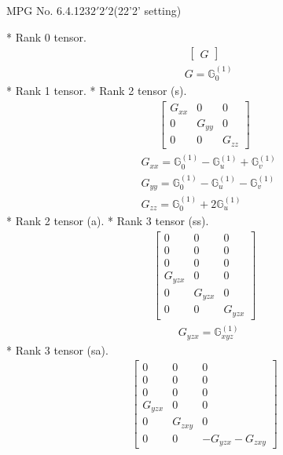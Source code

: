 \documentclass[fleqn,8pt,landscape]{jsarticle}
\begin{document}
\setcounter{MaxMatrixCols}{32}

\renewcommand{\tablename}{Table~}
\renewcommand{\figurename}{Figure~}
\begin{center}
\LARGE
MPG No. 6.4.123\quad$2'2'2$\quad(22'2' setting)
\end{center}
* Rank 0 tensor.
\begin{align*}
\begin{bmatrix} G \end{bmatrix}
\end{align*}
\begin{align*}
& G = \mathbb{G}_{0}^{(1)}
\end{align*}
* Rank 1 tensor.
* Rank 2 tensor (s).
\begin{align*}
\begin{bmatrix} G_{xx} & 0 & 0 \\ 0 & G_{yy} & 0 \\ 0 & 0 & G_{zz} \end{bmatrix}
\end{align*}
\begin{align*}
& G_{xx} = \mathbb{G}_{0}^{(1)} - \mathbb{G}_{u}^{(1)} + \mathbb{G}_{v}^{(1)} \\
& G_{yy} = \mathbb{G}_{0}^{(1)} - \mathbb{G}_{u}^{(1)} - \mathbb{G}_{v}^{(1)} \\
& G_{zz} = \mathbb{G}_{0}^{(1)} + 2 \mathbb{G}_{u}^{(1)}
\end{align*}
* Rank 2 tensor (a).
* Rank 3 tensor (ss).
\begin{align*}
\begin{bmatrix} 0 & 0 & 0 \\ 0 & 0 & 0 \\ 0 & 0 & 0 \\ G_{yzx} & 0 & 0 \\ 0 & G_{yzx} & 0 \\ 0 & 0 & G_{yzx} \end{bmatrix}
\end{align*}
\begin{align*}
& G_{yzx} = \mathbb{G}_{xyz}^{(1)}
\end{align*}
* Rank 3 tensor (sa).
\begin{align*}
\begin{bmatrix} 0 & 0 & 0 \\ 0 & 0 & 0 \\ 0 & 0 & 0 \\ G_{yzx} & 0 & 0 \\ 0 & G_{zxy} & 0 \\ 0 & 0 & - G_{yzx} - G_{zxy} \end{bmatrix}
\end{align*}
\end{document}
